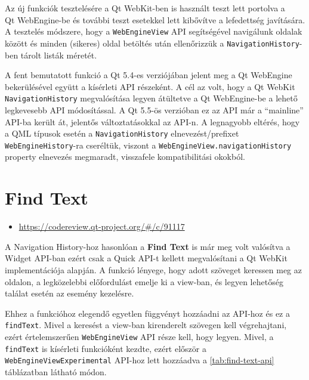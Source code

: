 \documentclass[12pt]{report}
\let\origurl\url
\renewcommand{\url}[1]{%
    \textcolor{blue}{\origurl{#1}}
}
\newcommand{\gerrit}[1]{%
    \textcolor{qtgreen}{\origurl{https://codereview.qt-project.org/\#/c/#1}}
}
\begin{document}
Az új funkciók tesztelésére a Qt WebKit-ben is használt teszt lett portolva a \\
Qt WebEngine-be és további teszt esetekkel lett kibővítve a lefedettség javítására.
A tesztelés módszere, hogy a \texttt{WebEngineView} API segítségével navigálunk oldalak
között és minden (sikeres) oldal betöltés után ellenőrizzük a \texttt{NavigationHistory}-ben
tárolt listák méretét.

A fent bemutatott funkció a Qt 5.4-es verziójában jelent meg a Qt WebEngine bekerülésével
együtt a kísérleti API részeként. A cél az volt, hogy a Qt WebKit \\
\texttt{NavigationHistory} megvalósítása legyen átültetve a Qt WebEngine-be a lehető
legkevesebb API módosítással.
A Qt 5.5-ös verzióban ez az API már a ``mainline'' API-ba került át, jelentős
változtatásokkal az API-n. A legnagyobb eltérés, hogy a QML típusok esetén a
\texttt{NavigationHistory} elnevezést/prefixet \texttt{WebEngineHistory}-ra cseréltük,
viszont a \texttt{WebEngineView.navigationHistory} property elnevezés megmaradt, visszafele
kompatibilitási okokból.


\section{Find Text}

\begin{center}
    \begin{reviewbox}
        \begin{itemize}
            \renewcommand{\labelitemi}{\textcolor{qtgreen}{$\blacktriangleright$}}
            \item \gerrit{91117}
        \end{itemize}
    \end{reviewbox}
\end{center}

\noindent
A Navigation History-hoz hasonlóan a \textbf{Find Text} is már meg volt valósítva a Widget
API-ban ezért csak a Quick API-t kellett megvalósítani a Qt WebKit implementációja alapján.
A funkció lényege, hogy adott szöveget keressen meg az oldalon, a legközelebbi előfordulást
emelje ki a view-ban, és legyen lehetőség találat esetén az esemény kezelésre.

Ehhez a funkcióhoz elegendő egyetlen függvényt hozzáadni az API-hoz és ez a \\
\texttt{findText}. Mivel a keresést a view-ban kirenderelt szövegen kell végrehajtani,
ezért értelemszerűen \texttt{WebEngineView} API része kell, hogy legyen. Mivel, a
\texttt{findText} is kísérleti funkcióként kezdte, ezért először a
\texttt{WebEngineViewExperimental} API-hoz lett hozzáadva a \ref{tab:find-text-api}
táblázatban látható módon.
\end{document}
